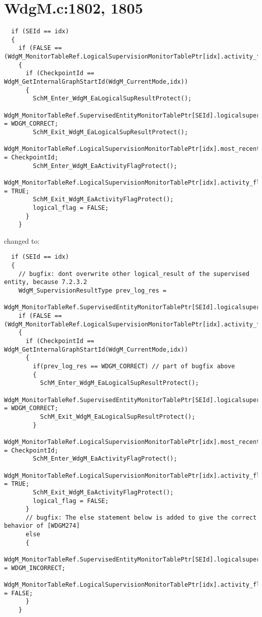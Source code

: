 \documentclass[11pt,a4paper]{article}
\begin{document}
\section{WdgM.c:1802, 1805}
\begin{lstlisting}
  if (SEId == idx)
  {
    if (FALSE == (WdgM_MonitorTableRef.LogicalSupervisionMonitorTablePtr[idx].activity_flag))
    {
      if (CheckpointId == WdgM_GetInternalGraphStartId(WdgM_CurrentMode,idx))
      {
        SchM_Enter_WdgM_EaLogicalSupResultProtect();
        WdgM_MonitorTableRef.SupervisedEntityMonitorTablePtr[SEId].logicalsupervision_result = WDGM_CORRECT;
        SchM_Exit_WdgM_EaLogicalSupResultProtect();
        WdgM_MonitorTableRef.LogicalSupervisionMonitorTablePtr[idx].most_recently_reported = CheckpointId;
        SchM_Enter_WdgM_EaActivityFlagProtect();
        WdgM_MonitorTableRef.LogicalSupervisionMonitorTablePtr[idx].activity_flag = TRUE;
        SchM_Exit_WdgM_EaActivityFlagProtect();
        logical_flag = FALSE;
      }
    }
\end{lstlisting}
changed to:
\begin{lstlisting}
  if (SEId == idx)
  {
    // bugfix: dont overwrite other logical_result of the supervised entity, because 7.2.3.2
    WdgM_SupervisionResultType prev_log_res =
      WdgM_MonitorTableRef.SupervisedEntityMonitorTablePtr[SEId].logicalsupervision_result;
    if (FALSE == (WdgM_MonitorTableRef.LogicalSupervisionMonitorTablePtr[idx].activity_flag))
    {
      if (CheckpointId == WdgM_GetInternalGraphStartId(WdgM_CurrentMode,idx))
      {
        if(prev_log_res == WDGM_CORRECT) // part of bugfix above
        {
          SchM_Enter_WdgM_EaLogicalSupResultProtect();
          WdgM_MonitorTableRef.SupervisedEntityMonitorTablePtr[SEId].logicalsupervision_result = WDGM_CORRECT;
          SchM_Exit_WdgM_EaLogicalSupResultProtect();
        }
        WdgM_MonitorTableRef.LogicalSupervisionMonitorTablePtr[idx].most_recently_reported = CheckpointId;
        SchM_Enter_WdgM_EaActivityFlagProtect();
        WdgM_MonitorTableRef.LogicalSupervisionMonitorTablePtr[idx].activity_flag = TRUE;
        SchM_Exit_WdgM_EaActivityFlagProtect();
        logical_flag = FALSE;
      }
      // bugfix: The else statement below is added to give the correct behavior of [WDGM274]
      else
      {
        WdgM_MonitorTableRef.SupervisedEntityMonitorTablePtr[SEId].logicalsupervision_result = WDGM_INCORRECT;
        WdgM_MonitorTableRef.LogicalSupervisionMonitorTablePtr[idx].activity_flag = FALSE;
      }
    }
\end{lstlisting}
\end{document}
